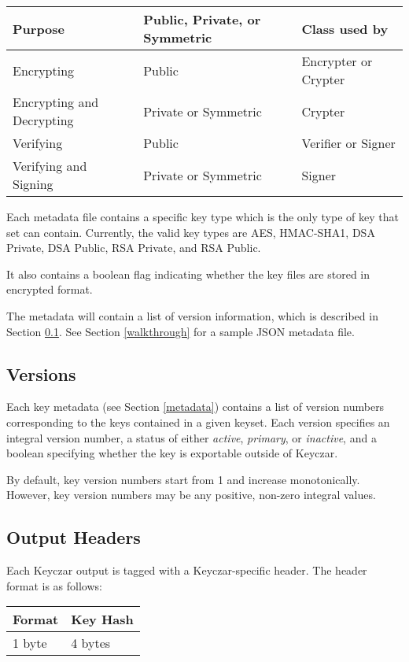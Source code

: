 \documentclass{llncs}
\begin{document}
\vspace*{3mm}
\begin{tabular}{ l | l | l }
{\bf Purpose} &  {\bf Public, Private, or Symmetric } & {\bf Class used by} \\
\hline Encrypting & Public & Encrypter or Crypter \\ \hline
Encrypting and Decrypting & Private or Symmetric & Crypter \\ \hline
Verifying & Public & Verifier or Signer \\ \hline 
Verifying and Signing & Private or Symmetric & Signer \\ \hline
\end{tabular}
\vspace*{3mm}

Each metadata file contains a specific key type which is the only type of key
that set can contain. Currently, the valid key types are AES, HMAC-SHA1, DSA
Private, DSA Public, RSA Private, and RSA Public.

It also contains a boolean flag indicating whether the key files are stored in
encrypted format.

The metadata will contain a list of version information, which is
described in Section \ref{versions}. See Section \ref{walkthrough} for a sample
JSON metadata file.

\subsection{Versions}\label{versions}

Each key metadata (see Section \ref{metadata}) contains a list of version
numbers corresponding to the keys contained in a given keyset. Each version
specifies an integral version number, a status of either {\it active}, {\it
primary}, or {\it inactive}, and a boolean specifying whether
the key is exportable outside of Keyczar.

By default, key version numbers start from 1 and increase monotonically.
However, key version numbers may be any positive, non-zero integral values.

\subsection{Output Headers} \label{header}

Each Keyczar output is tagged with a Keyczar-specific header. The header format
is as follows:

\vspace*{3mm}
\begin{tabular}{| l | l |}
\hline
Format & Key Hash \\ \hline
1 byte & 4 bytes \\ \hline
\end{tabular}
\vspace*{3mm}
\end{document}
